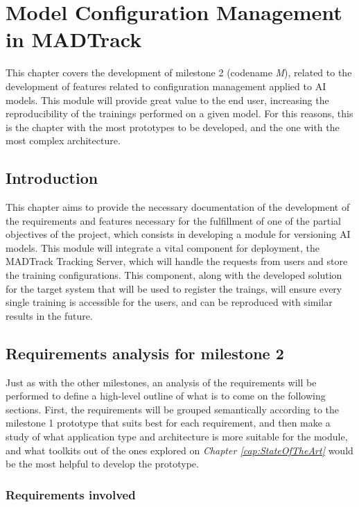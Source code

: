 \chapter{Model Configuration Management in MADTrack}\label{cap:Milestone2}

This chapter covers the development of milestone 2 (codename \emph{M}), related to the development of features related to configuration
management applied to \acrshort{AI} models. This module will provide great value to the end user, increasing the reproducibility of the
trainings performed on a given model. For this reasons, this is the chapter with the most prototypes to be developed, and the one with 
the most complex architecture.

\section{Introduction}

This chapter aims to provide the necessary documentation of the development of the requirements and features necessary for the fulfillment
of one of the partial objectives of the project, which consists in developing a module for versioning \acrshort{AI} models. This module will
integrate a vital component for deployment, the MADTrack Tracking Server, which will handle the requests from users and store the training 
configurations. This component, along with the developed solution for the target system that will be used to register the traings, will ensure
every single training is accessible for the users, and can be reproduced with similar results in the future.

\section{Requirements analysis for milestone 2}

Just as with the other milestones, an analysis of the requirements will be performed to define a high-level outline of what is to come on the 
following sections. First, the requirements will be grouped semantically according to the milestone 1 prototype that suits best for each requirement,
and then make a study of what application type and architecture is more suitable for the module, and what toolkits out of the ones explored on 
\emph{Chapter \ref{cap:StateOfTheArt}} would be the most helpful to develop the prototype.

\subsection{Requirements involved}

